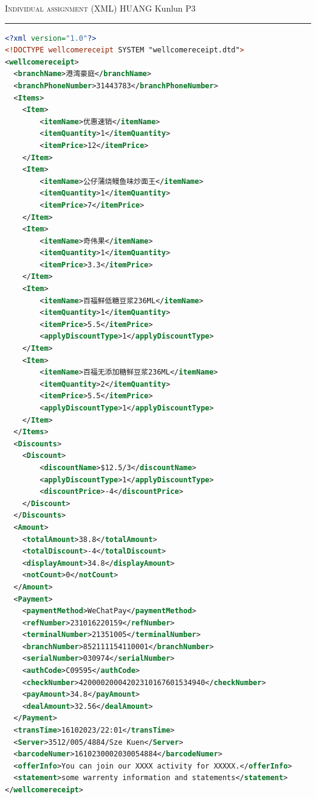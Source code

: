 \documentclass[12pt]{amsart}
\begin{document}
\newpage

 \hfill {\scshape \large Individual assignment (XML)} \hfill HUANG Kunlun \hfill {\scshape P3}
 
\smallskip

\hrule

\bigskip


\begin{lstlisting}[caption={XML file 1},label={lst:xmlfile1},
    language=XML,breaklines=true]
<?xml version="1.0"?>
<!DOCTYPE wellcomereceipt SYSTEM "wellcomereceipt.dtd">
<wellcomereceipt>
  <branchName>港湾豪庭</branchName>
  <branchPhoneNumber>31443783</branchPhoneNumber>
  <Items>
    <Item>
        <itemName>优惠速销</itemName>
        <itemQuantity>1</itemQuantity>
        <itemPrice>12</itemPrice>
    </Item>
    <Item>
        <itemName>公仔蒲烧鳗鱼味炒面王</itemName>
        <itemQuantity>1</itemQuantity>
        <itemPrice>7</itemPrice>
    </Item>
    <Item>
        <itemName>奇伟果</itemName>
        <itemQuantity>1</itemQuantity>
        <itemPrice>3.3</itemPrice>
    </Item>
    <Item>
        <itemName>百福鲜低糖豆浆236ML</itemName>
        <itemQuantity>1</itemQuantity>
        <itemPrice>5.5</itemPrice>
        <applyDiscountType>1</applyDiscountType>
    </Item>
    <Item>
        <itemName>百福无添加糖鲜豆浆236ML</itemName>
        <itemQuantity>2</itemQuantity>
        <itemPrice>5.5</itemPrice>
        <applyDiscountType>1</applyDiscountType>
    </Item>
  </Items>
  <Discounts>
    <Discount>
        <discountName>$12.5/3</discountName>
        <applyDiscountType>1</applyDiscountType>
        <discountPrice>-4</discountPrice>
    </Discount>
  </Discounts>
  <Amount>
    <totalAmount>38.8</totalAmount>
    <totalDiscount>-4</totalDiscount>
    <displayAmount>34.8</displayAmount>
    <notCount>0</notCount>
  </Amount>
  <Payment>
    <paymentMethod>WeChatPay</paymentMethod>
    <refNumber>231016220159</refNumber>
    <terminalNumber>21351005</terminalNumber>
    <branchNumber>852111154110001</branchNumber>
    <serialNumber>030974</serialNumber>
    <authCode>C09595</authCode>
    <checkNumber>42000020004202310167601534940</checkNumber>
    <payAmount>34.8</payAmount>
    <dealAmount>32.56</dealAmount>
  </Payment>
  <transTime>16102023/22:01</transTime>
  <Server>3512/005/4884/Sze Kuen</Server>
  <barcodeNumer>1610230002030054884</barcodeNumer>
  <offerInfo>You can join our XXXX activity for XXXXX.</offerInfo>
  <statement>some warrenty information and statements</statement>
</wellcomereceipt> 

\end{lstlisting}
\end{document}

